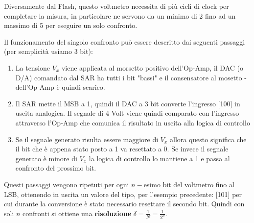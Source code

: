 \documentclass[a4paper,11pt]{report}
\begin{document}
Diversamente dal Flash, questo voltmetro necessita di più cicli di clock per completare la misura, in particolare ne servono da un minimo di 2 fino ad un massimo di 5 per eseguire un solo confronto.

Il funzionamento del singolo confronto può essere descritto dai seguenti passaggi (per semplicità usiamo 3 bit):
\begin{enumerate}
  \item La tensione $ V_x $ viene applicata al morsetto positivo dell'Op-Amp, il DAC (o D/A) comandato dal SAR ha tutti i bit "bassi" e il consensatore al mosetto - dell'Op-Amp è quindi scarico.
  \item Il SAR mette il MSB a 1, quindi il DAC a 3 bit converte l'ingresso [100] in uscita analogica. Il segnale di 4 Volt viene quindi comparato con l'ingresso attraverso l'Op-Amp che comunica il risultato in uscita alla logica di controllo
  \item Se il segnale generato risulta essere maggiore di $ V_x $ allora questo significa che il bit che è appena stato posto a 1 va resettato a 0. Se invece il segnale generato è minore di $ V_x $ la logica di controllo lo mantiene a 1 e passa al confronto del prossimo bit.
\end{enumerate}
Questi passaggi vengono ripetuti per ogni $ n-$esimo bit del voltmetro fino al LSB, ottenendo in uscita un valore del tipo, per l'esempio precedente: [101] per cui durante la conversione è stato necessario resettare il secondo bit. Quindi con soli $ n $ confronti si ottiene una \textbf{risoluzione} $ \delta = \frac{1}{N} = \frac{1}{2^n} $.\\
\end{document}
